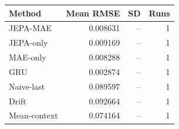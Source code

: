 \begin{tabular}{lrrr}
\hline
Method & Mean RMSE & SD & Runs \\
\hline
JEPA-MAE & 0.008631 & -- & 1 \\
JEPA-only & 0.009169 & -- & 1 \\
MAE-only & 0.008288 & -- & 1 \\
GRU & 0.002874 & -- & 1 \\
Naive-last & 0.089597 & -- & 1 \\
Drift & 0.092664 & -- & 1 \\
Mean-context & 0.074164 & -- & 1 \\
\hline
\end{tabular}
